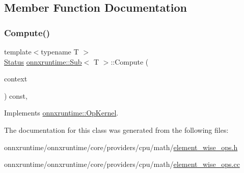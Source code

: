 \subsection{Member Function Documentation}
\mbox{\label{classonnxruntime_1_1Sub_a86037957e3fa998cf2a5ae5b6efd6aab}} 
\subsubsection{\texorpdfstring{Compute()}{Compute()}}
{\footnotesize\ttfamily template$<$typename T $>$ \\
\mbox{\hyperlink{classonnxruntime_1_1common_1_1Status}{Status}} \mbox{\hyperlink{classonnxruntime_1_1Sub}{onnxruntime\+::\+Sub}}$<$ T $>$\+::Compute (\begin{DoxyParamCaption}\item[{\mbox{\hyperlink{classonnxruntime_1_1OpKernelContext}{Op\+Kernel\+Context}} $\ast$}]{context }\end{DoxyParamCaption}) const\hspace{0.3cm}{\ttfamily [override]}, {\ttfamily [virtual]}}



Implements \mbox{\hyperlink{classonnxruntime_1_1OpKernel_a9eca8656a78b1b3ab9d3351a12798650}{onnxruntime\+::\+Op\+Kernel}}.



The documentation for this class was generated from the following files\+:\begin{DoxyCompactItemize}
\item 
onnxruntime/onnxruntime/core/providers/cpu/math/\mbox{\hyperlink{element__wise__ops_8h}{element\+\_\+wise\+\_\+ops.\+h}}\item 
onnxruntime/onnxruntime/core/providers/cpu/math/\mbox{\hyperlink{element__wise__ops_8cc}{element\+\_\+wise\+\_\+ops.\+cc}}\end{DoxyCompactItemize}
